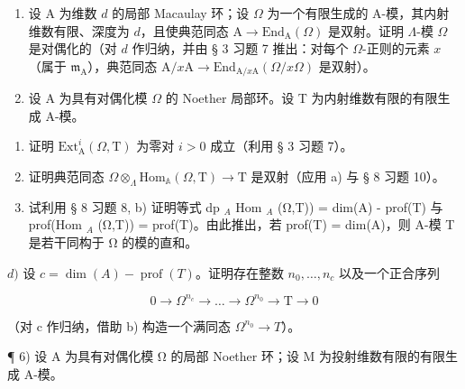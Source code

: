 \begin{enumerate}
\def\labelenumi{\arabic{enumi})}
\setcounter{enumi}{3}
\item
  设 A 为维数 \(d\) 的局部 Macaulay 环；设 \(\Omega\) 为一个有限生成的 A-模，其内射维数有限、深度为 \(d\)，且使典范同态 \(\mathrm{A} \to \mathrm{End}_{\mathrm{A}}(\Omega)\) 是双射。证明 \(\Lambda\)-模 \(\Omega\) 是对偶化的（对 \(d\) 作归纳，并由 § 3 习题 7 推出：对每个 \(\Omega\)-正则的元素 \(x\)（属于 \(\mathfrak{m}_{\mathrm{A}}\)），典范同态 \(\mathrm{A}/x\mathrm{A} \to \mathrm{End}_{\mathrm{A}/x\mathrm{A}}(\Omega/x\Omega)\) 是双射）。
\item
  设 A 为具有对偶化模 \(\Omega\) 的 Noether 局部环。设 T 为内射维数有限的有限生成 A-模。
\end{enumerate}

\begin{enumerate}
\def\labelenumi{\alph{enumi})}
\item
  证明 \(\mathrm{Ext}_{\mathrm{A}}^{i}(\Omega, \mathrm{T})\) 为零对 \(i > 0\) 成立（利用 § 3 习题 7）。
\item
  证明典范同态 \(\Omega\otimes_{\Lambda}\mathrm{Hom}_{\mathbb{A}}(\Omega,\mathrm{T})\to\mathrm{T}\) 是双射（应用 a) 与 § 8 习题 10）。
\item
  试利用 § 8 习题 8, b) 证明等式 dp \(_{A}\) Hom \(_{A}\) (Ω,T)) = dim(A) - prof(T) 与 prof(Hom \(_{A}\) (Ω,T)) = prof(T)。由此推出，若 prof(T) = dim(A)，则 A-模 T 是若干同构于 Ω 的模的直和。
\end{enumerate}

\(d)\) 设 \(c = \dim(A) - \operatorname{prof}(T)\)。证明存在整数 \(n_0, \ldots, n_c\) 以及一个正合序列

\[
0 \rightarrow \Omega^ {n _ {c}} \rightarrow \dots \rightarrow \Omega^ {n _ {0}} \rightarrow \mathrm{T} \rightarrow 0
\]

（对 c 作归纳，借助 b) 构造一个满同态 \(\Omega^{n_{0}} \to T\)）。

¶ 6) 设 A 为具有对偶化模 Ω 的局部 Noether 环；设 M 为投射维数有限的有限生成 A-模。

